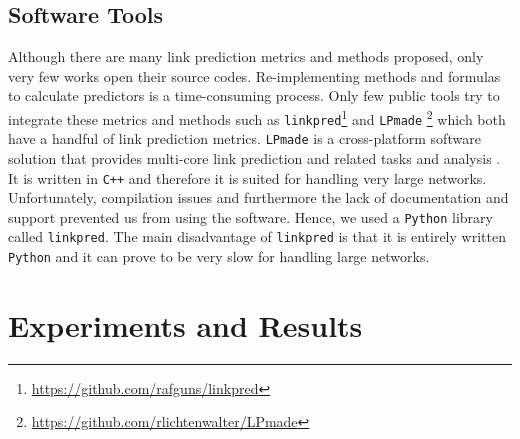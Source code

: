 \documentclass{acm_proc_article-sp}
\begin{document}
\subsection{Software Tools}
Although there are many link prediction metrics and methods proposed, only very few works open their source codes. Re-implementing methods and formulas to calculate predictors is a time-consuming process. Only few public tools try to integrate these metrics and methods such as \texttt{linkpred}\footnote{\url{https://github.com/rafguns/linkpred}} and \texttt{LPmade} \footnote{\url{https://github.com/rlichtenwalter/LPmade}} \cite{lichtenwalter2011lpmade} which both have a handful of link prediction metrics. \texttt{LPmade} is a cross-platform software solution that provides multi-core link prediction and related tasks and analysis \cite{lichtenwalter2011lpmade}. It is written in \texttt{C++} and therefore it is suited for handling very large networks. Unfortunately, compilation issues and furthermore the lack of documentation and support prevented us from using the software. Hence, we used a \texttt{Python} library called \texttt{linkpred}. The main disadvantage of \texttt{linkpred} is that it is entirely written \texttt{Python} and it can prove to be very slow for handling large networks.

\section{Experiments and Results}
\label{Sect.6}
\end{document}

